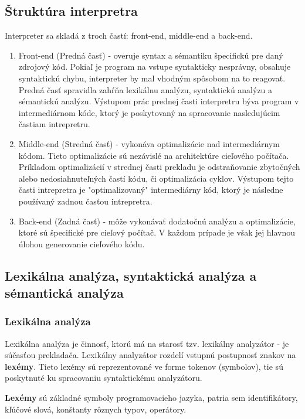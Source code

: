 \subsection{Štruktúra interpretra}
Interpreter sa skladá z troch častí: front-end, middle-end a back-end.

\begin{enumerate}
	\item Front-end (Predná časť) - overuje syntax a sémantiku špecifickú pre daný zdrojový kód. 
	Pokiaľ je program na vstupe syntakticky nesprávny, obsahuje syntaktickú chybu, 
	interpreter by mal vhodným spôsobom na to reagovať. 
	Predná časť spravidla zahŕňa lexikálnu analýzu, syntaktickú analýzu a sémantickú analýzu.
	Výstupom prác prednej časti interpretru býva program v intermediárnom kóde, 
	ktorý je poskytovaný na spracovanie nasledujúcim častiam intrepretru.

	\item Middle-end (Stredná časť) - vykonáva optimalizácie nad intermediárnym kódom. 
	Tieto optimalizácie sú nezávislé na architektúre cieľového počítača. 
	Príkladom optimalizácií v strednej časti prekladu je odstraňovanie zbytočných 
	alebo nedosiahnuteľných častí kódu, či optimalizácia cyklov. Výstupom tejto časti intrepretra 
	je "optimalizovaný" intermediárny kód, ktorý je následne používaný zadnou časťou intrepretra.

	\item Back-end (Zadná časť) -  môže vykonávať dodatočnú analýzu a optimalizácie, 
	ktoré sú špecifické pre cieľový počítač. V každom prípade je však jej hlavnou úlohou 
	generovanie cieľového kódu.
\end{enumerate}

\subsection{Lexikálna analýza, syntaktická analýza a sémantická analýza}

\subsubsection{Lexikálna analýza}
Lexikálna analýza je činnosť, ktorú má na starosť tzv. lexikálny analyzátor - 
je súčasťou prekladača. Lexikálny analyzátor rozdelí vstupnú postupnosť znakov na \textbf{lexémy}. 
Tieto lexémy sú reprezentované ve forme tokenov (symbolov), tie sú poskytnuté 
ku spracovaniu syntaktickému analyzátoru.

\textbf{Lexémy} sú základné symboly programovacieho jazyka, patria sem identifikátory,
kľúčové slová, konštanty rôznych typov, operátory.

